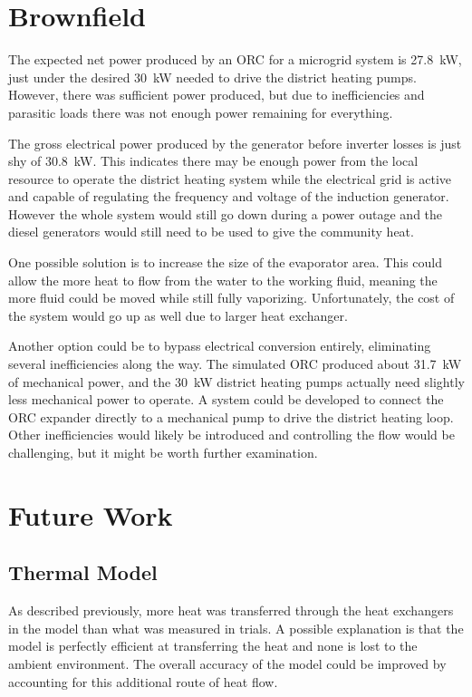 \section{Brownfield}
The expected net power produced by an ORC for a microgrid system is \SI{27.8}{\kilo\watt}, just under the desired \SI{30}{\kilo\watt} needed to drive the district heating pumps. However, there was sufficient power produced, but due to inefficiencies and parasitic loads there was not enough power remaining for everything. 

The gross electrical power produced by the generator before inverter losses is just shy of \SI{30.8}{\kilo\watt}. This indicates there may be enough power from the local resource to operate the district heating system while the electrical grid is active and capable of regulating the frequency and voltage of the induction generator. However the whole system would still go down during a power outage and the diesel generators would still need to be used to give the community heat.

One possible solution is to increase the size of the evaporator area. This could allow the more heat to flow from the water to the working fluid, meaning the more fluid could be moved while still fully vaporizing. Unfortunately, the cost of the system would go up as well due to larger heat exchanger.

Another option could be to bypass electrical conversion entirely, eliminating several inefficiencies along the way. The simulated ORC produced about \SI{31.7}{\kilo\watt} of mechanical power, and the \SI{30}{\kilo\watt} district heating pumps actually need slightly less mechanical power to operate. A system could be developed to connect the ORC expander directly to a mechanical pump to drive the district heating loop. Other inefficiencies would likely be introduced and controlling the flow would be challenging, but it might be worth further examination.

\section{Future Work}
\subsection{Thermal Model}
As described previously, more heat was transferred through the heat exchangers in the model than what was measured in trials. A possible explanation is that the model is perfectly efficient at transferring the heat and none is lost to the ambient environment. The overall accuracy of the model could be improved by accounting for this additional route of heat flow.

